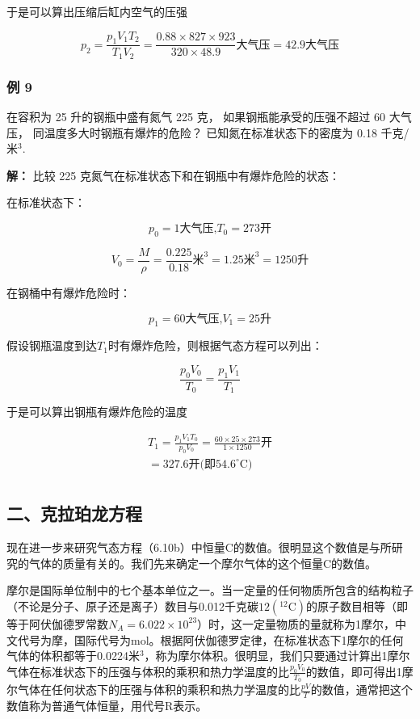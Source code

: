 于是可以算出压缩后缸内空气的压强

\[
p _ {2} = \frac {p _ {1} V _ {1} T _ {2}}{T _ {1} V _ {2}} = \frac {0.88 \times 827 \times 923}{320 \times 48.9} \text{大气压} = 42.9 \text{大气压}
\]

\subsubsection{例 9}\label{ux4f8b-9-1}

在容积为 25 升的钢瓶中盛有氮气 225 克， 如果钢瓶能承受的压强不超过 60
大气压， 同温度多大时钢瓶有爆炸的危险？ 已知氮在标准状态下的密度为 0.18
千克/米\(^{3}\).

\textbf{解：} 比较 225 克氮气在标准状态下和在钢瓶中有爆炸危险的状态：

在标准状态下：

\[
p _ {0} = 1 \text{大气压,} T _ {0} = 273 \text{开}
\]

\[
V _ {0} = \frac {M}{\rho} = \frac {0.225}{0.18} \text{米} ^ {3} = 1.25 \text{米} ^ {3} = 1250 \text{升}
\]

在钢桶中有爆炸危险时：

\[
p _ {1} = 60 \text{大气压,} V _ {1} = 25 \text{升}
\]

假设钢瓶温度到达\(T_{1}\)时有爆炸危险，则根据气态方程可以列出：

\[
\frac {p _ {0} V _ {0}}{T _ {0}} = \frac {p _ {1} V _ {1}}{T _ {1}}
\]

于是可以算出钢瓶有爆炸危险的温度

\[
\begin{array}{l} T _ {1} = \frac {p _ {1} V _ {1} T _ {0}}{p _ {0} V _ {0}} = \frac {60 \times 25 \times 273}{1 \times 1250} \text{开} \\ = 327.6 \text{开(即} 54.6 ^ {\circ} \mathrm{C)} \\ \end{array}
\]

\subsection{二、克拉珀龙方程}\label{ux4e8cux514bux62c9ux73c0ux9f99ux65b9ux7a0b}

现在进一步来研究气态方程（6.10b）中恒量C的数值。很明显这个数值是与所研究的气体的质量有关的。我们先来确定一个摩尔气体的这个恒量C的数值。

摩尔是国际单位制中的七个基本单位之一。当一定量的任何物质所包含的结构粒子（不论是分子、原子还是离子）数目与0.012千克碳\(12(^{12}\mathrm{C})\)的原子数目相等（即等于阿伏伽德罗常数\(N_{A}=6.022\times10^{23}\)）时，这一定量物质的量就称为1摩尔，中文代号为摩，国际代号为mol。根据阿伏伽德罗定律，在标准状态下1摩尔的任何气体的体积都等于0.0224米\(^{3}\)，称为摩尔体积。很明显，我们只要通过计算出1摩尔气体在标准状态下的压强与体积的乘积和热力学温度的比\(\frac{p_{0}V_{0}}{T_{0}}\)的数值，即可得出1摩尔气体在任何状态下的压强与体积的乘积和热力学温度的比\(\frac{pV}{T}\)的数值，通常把这个数值称为普通气体恒量，用代号R表示。

